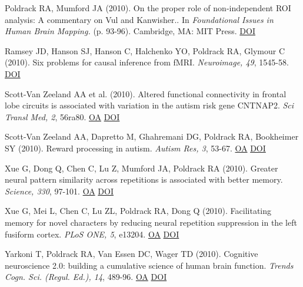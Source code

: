 Poldrack RA, Mumford JA (2010). On the proper role of non-independent ROI analysis: A commentary on Vul and Kanwisher.. In \textit{Foundational Issues in Human Brain Mapping.} (p. 93-96). Cambridge, MA: MIT Press. \href{http://dx.doi.org/10.7551/mitpress/9780262014021.001.0001-ymwkkriy}{DOI} \vspace{2mm}

Ramsey JD, Hanson SJ, Hanson C, Halchenko YO, Poldrack RA, Glymour C (2010). Six problems for causal inference from fMRI. \textit{Neuroimage, 49}, 1545-58. \href{http://dx.doi.org/10.1016/j.neuroimage.2009.08.065}{DOI} \vspace{2mm}

Scott-Van Zeeland AA et al. (2010). Altered functional connectivity in frontal lobe circuits is associated with variation in the autism risk gene CNTNAP2. \textit{Sci Transl Med, 2}, 56ra80. \href{https://www.ncbi.nlm.nih.gov/pmc/articles/PMC3065863}{OA} \href{http://dx.doi.org/10.1126/scitranslmed.3001344}{DOI} \vspace{2mm}

Scott-Van Zeeland AA, Dapretto M, Ghahremani DG, Poldrack RA, Bookheimer SY (2010). Reward processing in autism. \textit{Autism Res, 3}, 53-67. \href{https://www.ncbi.nlm.nih.gov/pmc/articles/PMC3076289}{OA} \href{http://dx.doi.org/10.1002/aur.122}{DOI} \vspace{2mm}

Xue G, Dong Q, Chen C, Lu Z, Mumford JA, Poldrack RA (2010). Greater neural pattern similarity across repetitions is associated with better memory. \textit{Science, 330}, 97-101. \href{https://www.ncbi.nlm.nih.gov/pmc/articles/PMC2952039}{OA} \href{http://dx.doi.org/10.1126/science.1193125}{DOI} \vspace{2mm}

Xue G, Mei L, Chen C, Lu ZL, Poldrack RA, Dong Q (2010). Facilitating memory for novel characters by reducing neural repetition suppression in the left fusiform cortex. \textit{PLoS ONE, 5}, e13204. \href{https://www.ncbi.nlm.nih.gov/pmc/articles/PMC2950859}{OA} \href{http://dx.doi.org/10.1371/journal.pone.0013204}{DOI} \vspace{2mm}

Yarkoni T, Poldrack RA, Van Essen DC, Wager TD (2010). Cognitive neuroscience 2.0: building a cumulative science of human brain function. \textit{Trends Cogn. Sci. (Regul. Ed.), 14}, 489-96. \href{https://www.ncbi.nlm.nih.gov/pmc/articles/PMC2963679}{OA} \href{http://dx.doi.org/10.1016/j.tics.2010.08.004}{DOI} \vspace{2mm}

